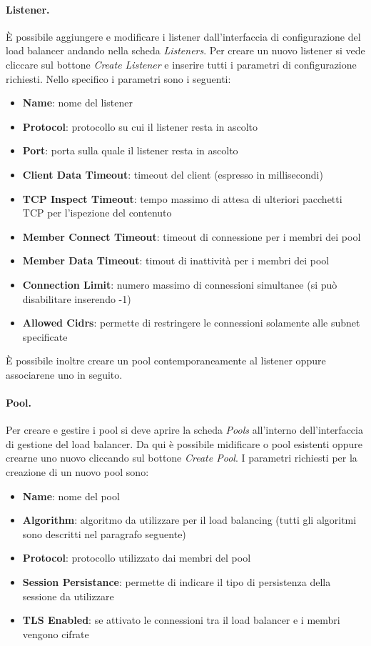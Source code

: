 \paragraph{Listener.} È possibile aggiungere e modificare i listener dall'interfaccia di configurazione del load balancer andando nella scheda \emph{Listeners}. Per creare un nuovo listener si vede cliccare sul bottone \emph{Create Listener} e inserire tutti i parametri di configurazione richiesti. Nello specifico i parametri sono i seguenti:
\begin{itemize}
    \item \textbf{Name}: nome del listener
    \item \textbf{Protocol}: protocollo su cui il listener resta in ascolto
    \item \textbf{Port}: porta sulla quale il listener resta in ascolto
    \item \textbf{Client Data Timeout}: timeout del client (espresso in millisecondi)
    \item \textbf{TCP Inspect Timeout}: tempo massimo di attesa di ulteriori pacchetti TCP per l'ispezione del contenuto
    \item \textbf{Member Connect Timeout}: timeout di connessione per i membri dei pool
    \item \textbf{Member Data Timeout}: timout di inattività per i membri dei pool
    \item \textbf{Connection Limit}: numero massimo di connessioni simultanee (si può disabilitare inserendo -1)
    \item \textbf{Allowed Cidrs}: permette di restringere le connessioni solamente alle subnet specificate
\end{itemize}

È possibile inoltre creare un pool contemporaneamente al listener oppure associarene uno in seguito.

\paragraph{Pool.} Per creare e gestire i pool si deve aprire la scheda \emph{Pools} all'interno dell'interfaccia di gestione del load balancer. Da qui è possibile midificare o pool esistenti oppure crearne uno nuovo cliccando sul bottone \emph{Create Pool}. I parametri richiesti per la creazione di un nuovo pool sono:
\begin{itemize}
    \item \textbf{Name}: nome del pool
    \item \textbf{Algorithm}: algoritmo da utilizzare per il load balancing (tutti gli algoritmi sono descritti nel paragrafo seguente)
    \item \textbf{Protocol}: protocollo utilizzato dai membri del pool
    \item \textbf{Session Persistance}: permette di indicare il tipo di persistenza della sessione da utilizzare
    \item \textbf{TLS Enabled}: se attivato le connessioni tra il load balancer e i membri vengono cifrate
\end{itemize}

